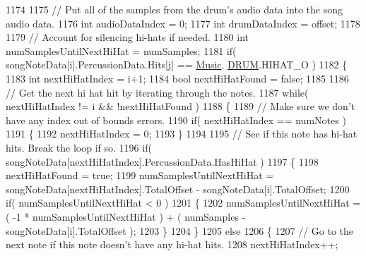 \begin{DoxyCodeInclude}
1174 
1175                     \textcolor{comment}{// Put all of the samples from the drum's audio data into the song audio data.}
1176                     \textcolor{keywordtype}{int} audioDataIndex = 0;
1177                     \textcolor{keywordtype}{int} drumDataIndex = offset;
1178 
1179                     \textcolor{comment}{// Account for silencing hi-hats if needed.}
1180                     \textcolor{keywordtype}{int} numSamplesUntilNextHiHat = numSamples;
1181                     \textcolor{keywordflow}{if}( songNoteData[i].PercussionData.Hits[j] == \hyperlink{class_music}{Music}.
      \hyperlink{group___music_enums_gade475b4382c7066d1af13e7c13c029b6}{DRUM}.HIHAT\_O )
1182                     \{
1183                         \textcolor{keywordtype}{int} nextHiHatIndex = i+1;
1184                         \textcolor{keywordtype}{bool} nextHiHatFound = \textcolor{keyword}{false};
1185 
1186                         \textcolor{comment}{// Get the next hi hat hit by iterating through the notes.}
1187                         \textcolor{keywordflow}{while}( nextHiHatIndex != i && !nextHiHatFound )
1188                         \{
1189                             \textcolor{comment}{// Make sure we don't have any index out of bounds errors.}
1190                             \textcolor{keywordflow}{if}( nextHiHatIndex == numNotes )
1191                             \{
1192                                 nextHiHatIndex = 0;
1193                             \}
1194 
1195                             \textcolor{comment}{// See if this note has hi-hat hits. Break the loop if so.}
1196                             \textcolor{keywordflow}{if}( songNoteData[nextHiHatIndex].PercussionData.HasHiHat )
1197                             \{
1198                                 nextHiHatFound = \textcolor{keyword}{true};
1199                                 numSamplesUntilNextHiHat = songNoteData[nextHiHatIndex].TotalOffset - 
      songNoteData[i].TotalOffset;
1200                                 \textcolor{keywordflow}{if}( numSamplesUntilNextHiHat < 0 )
1201                                 \{
1202                                     numSamplesUntilNextHiHat = ( -1 * numSamplesUntilNextHiHat ) + ( 
      numSamples - songNoteData[i].TotalOffset );
1203                                 \}
1204                             \}
1205                             \textcolor{keywordflow}{else}
1206                             \{
1207                                 \textcolor{comment}{// Go to the next note if this note doesn't have any hi-hat hits.}
1208                                 nextHiHatIndex++;

\end{DoxyCodeInclude}
